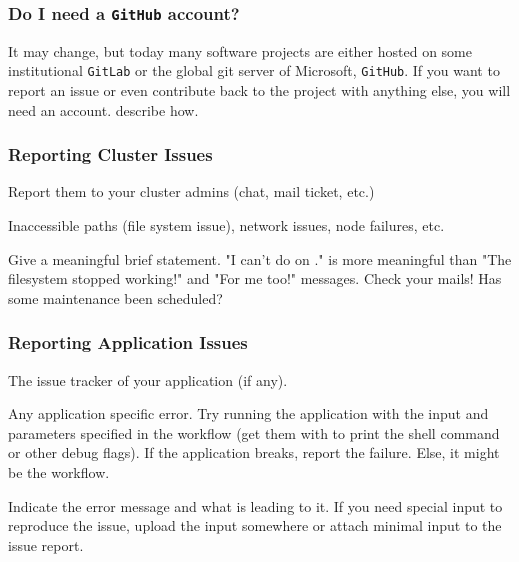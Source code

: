 \begin{frame}
  \frametitle{Do I need a \texttt{GitHub} account?}
  It may change, but today many software projects are either hosted on some institutional \texttt{GitLab} or the global git server of Microsoft, \texttt{GitHub}.\newline
  If you want to report an issue or even contribute back to the project with anything else, you will need an account.  describe how. 
\end{frame}

\begin{frame}
	\frametitle{Reporting Cluster Issues}
	\begin{question}[Where to?]
	  Report them to your cluster admins (chat, mail ticket, etc.)
	\end{question}
    \pause
    \begin{question}[What?]
      Inaccessible paths (file system issue), network issues, node failures, etc. 
    \end{question}
    \pause
    \begin{question}[How?]
      Give a meaningful brief statement. "I can't do  on ." is more meaningful than "The filesystem stopped working!" and "For me too!" messages.\newline
      \bcattention Check your mails! Has some maintenance been scheduled?
    \end{question}	
\end{frame}

\begin{frame}
	\frametitle{Reporting Application Issues}
	\begin{question}[Where to?]
		The issue tracker of your application (if any). 
	\end{question}
	\pause
	\begin{question}[What?]
		Any application specific error. Try running the application with the input and parameters specified in the workflow (get them with  to print the shell command or other debug flags). If the application breaks, report the failure. Else, it might be the workflow.
	\end{question}
	\pause
	\begin{question}[How?]
		Indicate the error message and what is leading to it. If you need special input to reproduce the issue, upload the input somewhere or attach minimal input to the issue report.
	\end{question}
\end{frame}

